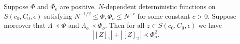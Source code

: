\begin{lemma} \label{abstractdecoupling}
Suppose $\Phi$ and $\Phi_o$ are positive, $N$-dependent deterministic functions on $S(c_0,C_0,\epsilon)$ satisfying $N^{-1/2} \le \Phi, \Phi_o \le N^{-c}$ for some constant $c>0$. Suppose moreover that $\Lambda \prec \Phi$ and $\Lambda_o \prec \Phi_o$. Then for all $z \in S(c_0,C_0,\epsilon)$ we have
\begin{equation}\label{flucaver_ZZ}
\left|[Z]_1 \right| + \left|[Z]_2 \right| \prec   {\Phi _o^2}.
\end{equation}
\end{lemma}
